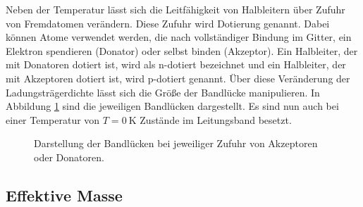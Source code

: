 Neben der Temperatur lässt sich die Leitfähigkeit von Halbleitern über Zufuhr von Fremdatomen verändern.
Diese Zufuhr wird Dotierung genannt.
Dabei können Atome verwendet werden, die nach vollständiger Bindung im Gitter, ein Elektron spendieren (Donator) oder selbst binden (Akzeptor). 
Ein Halbleiter, der mit Donatoren dotiert ist, wird als n-dotiert bezeichnet und ein Halbleiter, der mit Akzeptoren dotiert ist, wird p-dotiert genannt.
Über diese Veränderung der Ladungsträgerdichte lässt sich die Größe der Bandlücke manipulieren. 
In Abbildung \ref{fig:ak_don} sind die jeweiligen Bandlücken dargestellt.
Es sind nun auch bei einer Temperatur von $T=\SI{0}{\kelvin}$ Zustände im Leitungsband besetzt.

\begin{figure}[!ht]
    \centering
    \caption{Darstellung der Bandlücken bei jeweiliger Zufuhr von Akzeptoren oder Donatoren.}
    \label{fig:ak_don}
\end{figure}


\subsection{Effektive Masse}

